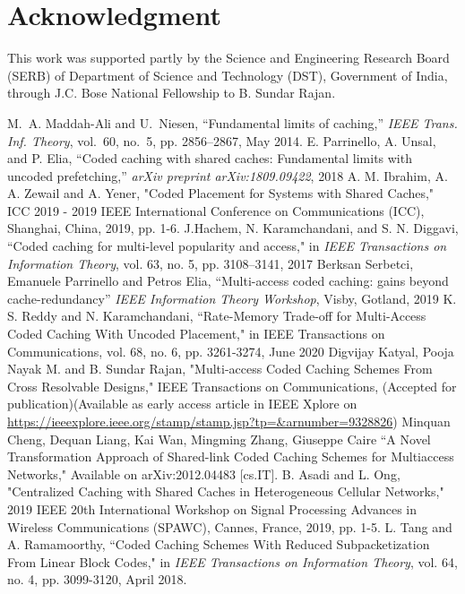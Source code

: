 \documentclass[conference]{IEEEtran}
\begin{document}
	\section*{Acknowledgment}
	This work was supported partly by the Science and Engineering Research Board (SERB) of Department of Science and Technology (DST), Government of India, through J.C. Bose National Fellowship to B. Sundar Rajan.
	
	\begin{thebibliography}{1}
		
		M.~A. Maddah-Ali and U.~Niesen, ``Fundamental limits of caching,'' \emph{{IEEE}
			Trans. Inf. Theory}, vol.~60, no.~5, pp. 2856--2867, May 2014.
		E. Parrinello, A. Unsal, and P. Elia, ``Coded caching with shared caches: Fundamental limits with uncoded prefetching,”
		\textit{arXiv preprint arXiv:1809.09422}, 2018
		A. M. Ibrahim, A. A. Zewail and A. Yener, "Coded Placement for Systems with Shared Caches," ICC 2019 - 2019 IEEE International Conference on Communications (ICC), Shanghai, China, 2019, pp. 1-6.
		J.Hachem, N. Karamchandani, and S. N. Diggavi, ``Coded caching for multi-level popularity and access," in \textit{IEEE Transactions on Information Theory}, vol. 63, no. 5, pp. 3108–3141, 2017
		Berksan Serbetci, Emanuele Parrinello and Petros Elia, ``Multi-access coded caching: gains beyond cache-redundancy” \textit{IEEE Information Theory Workshop}, Visby, Gotland, 2019
		K. S. Reddy and N. Karamchandani, ``Rate-Memory Trade-off for Multi-Access Coded Caching With Uncoded Placement," in IEEE Transactions on Communications, vol. 68, no. 6, pp. 3261-3274, June 2020
		 Digvijay Katyal, Pooja Nayak M. and B. Sundar Rajan,  "Multi-access Coded Caching Schemes From Cross Resolvable Designs," IEEE Transactions on Communications, (Accepted for publication)(Available as early access article in IEEE Xplore on \url{https://ieeexplore.ieee.org/stamp/stamp.jsp?tp=&arnumber=9328826})
		Minquan Cheng, Dequan Liang, Kai Wan, Mingming Zhang, Giuseppe Caire
		``A Novel Transformation Approach of Shared-link Coded Caching Schemes for Multiaccess Networks," Available on  arXiv:2012.04483 [cs.IT].
		B. Asadi and L. Ong, "Centralized Caching with Shared Caches in Heterogeneous Cellular Networks," 2019 IEEE 20th International Workshop on Signal Processing Advances in Wireless Communications (SPAWC), Cannes, France, 2019, pp. 1-5.
		L. Tang and A. Ramamoorthy, ``Coded Caching Schemes With Reduced Subpacketization From Linear Block Codes," in \textit{IEEE Transactions on Information Theory}, vol. 64, no. 4, pp. 3099-3120, April 2018.
	

\end{thebibliography}
\end{document}
